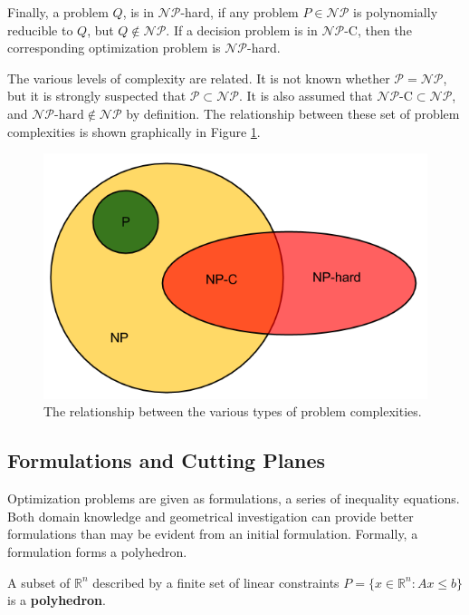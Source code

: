 Finally, a problem $Q$, is in $\mathcal{NP}$-hard, if any problem
$P \in \mathcal{NP}$ is polynomially reducible to $Q$, but
$Q \not\in \mathcal{NP}$. If a decision problem is in $\mathcal{NP}$-C, then the
corresponding optimization problem is $\mathcal{NP}$-hard.

The various levels of complexity are related. It is not known whether
$\mathcal{P} = \mathcal{NP}$, but it is strongly suspected that
$\mathcal{P} \subset \mathcal{NP}$. It is also assumed that
$\mathcal{NP}\text{-C} \subset \mathcal{NP}$, and
$\mathcal{NP}\text{-hard} \notin \mathcal{NP}$ by definition. The relationship
between these set of problem complexities is shown graphically in
Figure \ref{fig:complexity}.

\begin{figure}[H]
  \begin{center}
    \includegraphics[width=\linewidth]{./chapters/litreview/complexity.png}
  \caption{The relationship between the various types of problem complexities.}
  \label{fig:complexity}
  \end{center}
\end{figure}


\subsection{Formulations and Cutting Planes}\label{sec:formulations}

Optimization problems are given as formulations, a series of inequality
equations. Both domain knowledge and geometrical investigation can provide
better formulations than may be evident from an initial formulation. Formally, a
formulation forms a polyhedron.

\begin{define}\label{def:polyhedron}
A subset of $\mathbb{R}^n$ described by a finite set of linear constraints $P
= \{ x \in \mathbb{R}^n : Ax \leq b\}$ is a \textbf{polyhedron}.
\end{define}

